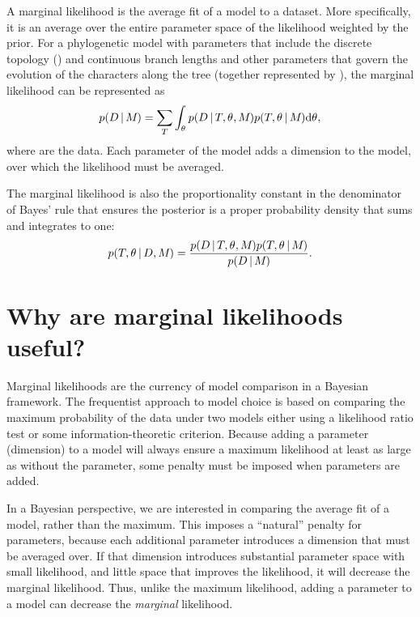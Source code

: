 \begin{linenomath}
A marginal likelihood is the average fit of a model to a dataset.
More specifically, it is an average over the entire parameter space of the
likelihood weighted by the prior.
For a phylogenetic model \model with parameters that include the discrete
topology (\topology) and continuous branch lengths and other parameters that
govern the evolution of the characters along the tree (together represented by
\evoparameters), the marginal likelihood can be represented as
\begin{equation}
    p(D \,|\, M_{}) =
    \sum\limits_{T}
    \int_{\theta_{}}
    p( D \,|\, T, \theta_{}, M_{})
    p(T, \theta_{} \,|\, M_{})
    \mathrm{d}\theta_{},
    \label{eq:marginalLikelihood}
\end{equation}
where \data are the data.
Each parameter of the model adds a dimension to the model, over which the
likelihood must be averaged.
\end{linenomath}

\begin{linenomath}
The marginal likelihood is also the proportionality constant in the denominator
of Bayes' rule that ensures the posterior is a proper probability density that
sums and integrates to one:
\begin{equation}
    p(T, \theta_{} \,|\, D, M_{}) = \frac{
        p(D \,|\, T, \theta_{}, M_{})
        p(T, \theta_{} \,|\, M_{})
    }{
        p(D \,|\, M_{})
    }.
    \label{eq:bayesRule}
\end{equation}
\end{linenomath}

\section{Why are marginal likelihoods useful?}

Marginal likelihoods are the currency of model comparison in a Bayesian
framework. The frequentist approach to model choice is based on comparing
the maximum probability of the data under two models either using
a likelihood ratio test or some information-theoretic criterion.
Because adding a parameter (dimension) to a model will always ensure
a maximum likelihood at least as large as without the parameter, some
penalty must be imposed when parameters are added.

In a Bayesian perspective, we are interested in comparing the average fit of a
model, rather than the maximum.
This imposes a ``natural'' penalty for parameters, because each additional
parameter introduces a dimension that must be averaged over.
If that dimension introduces substantial parameter space with small likelihood,
and little space that improves the likelihood, it will decrease the marginal
likelihood.
Thus, unlike the maximum likelihood, adding a parameter to a model can
decrease the \emph{marginal} likelihood.

